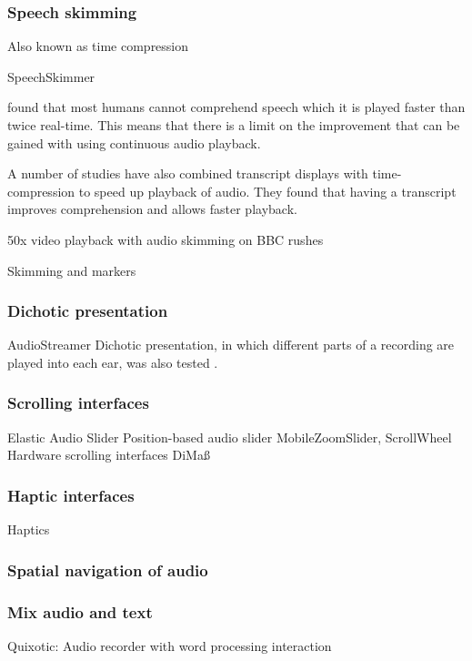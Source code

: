 \subsubsection{Speech skimming}

Also known as time compression

SpeechSkimmer \citep{Arons1997}

\citet{Arons1997} found that most humans cannot comprehend speech which it is played faster than twice real-time. This
means that there is a limit on the improvement that can be gained with using continuous audio playback.

A number of studies \citep{Whittaker2002,Vemuri2004,Ranjan2006} have also
combined transcript displays with time-compression to speed up playback of audio. They found that having a transcript
improves comprehension and allows
faster playback.

50x video playback with audio skimming on BBC rushes \citep{Christel2008}

Skimming and markers \citep{Dhanesha2010}


\subsubsection{Dichotic presentation}
AudioStreamer \citep{Schmandt1995}
Dichotic presentation, in which different parts of a recording are played into
each ear, was also tested \citep{Ranjan2006}.

\subsubsection{Scrolling interfaces}
Elastic Audio Slider \citep{Hurst2004}
Position-based audio slider \citep{Hurst2006}
MobileZoomSlider, ScrollWheel \citep{Huerst2008}
Hardware scrolling interfaces \citep{Lee2007}
DiMa\ss \citep{Lee2006}

\subsubsection{Haptic interfaces}
Haptics
\citep{Metatla2016}

\subsubsection{Spatial navigation of audio}
\citep{Kobayashi1997}

\subsubsection{Mix audio and text}
Quixotic: Audio recorder with word processing interaction \citep{Milota2015}

